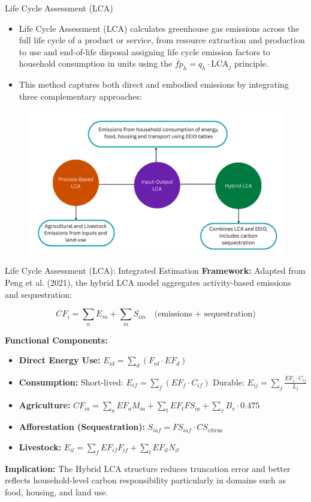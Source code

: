 \documentclass{beamer}
\begin{document}
\begin{frame}{Life Cycle Assessment (LCA)}
\footnotesize
\vspace{-2.5em}
\begin{itemize}
\item Life Cycle Assessment (LCA) calculates greenhouse gas emissions across the full life cycle of a product or service, from resource extraction and production to use and end-of-life disposal assigning life cycle emission factors to household consumption in units using the \textbf{$fp_h = q_h \cdot \text{LCA}_j$} principle. 
\item This method captures both direct and embodied emissions by integrating three complementary approaches:
\end{itemize}
\vspace{-0.5em}
\begin{figure}
\centering
\includegraphics[width=0.7\linewidth]{LCA Visual.png}
\end{figure}
\end{frame}

\begin{frame}{Life Cycle Assessment (LCA): Integrated Estimation}
\footnotesize
\vspace{-2.5em}
\textbf{Framework:}  
Adapted from Peng et al. (2021), the hybrid LCA model aggregates activity-based emissions and sequestration:

\[
CF_i = \sum_n E_{in} + \sum_m S_{im}
\quad \text{(emissions + sequestration)}
\]

\vspace{0.3em}
\textbf{Functional Components:}
\begin{itemize}
  \item \textbf{Direct Energy Use:} $E_{id} = \sum_d (F_{id} \cdot EF_d)$
  \item \textbf{Consumption:} Short-lived: $E_{if} = \sum_f (EF_f \cdot C_{if})$  
        Durable: $E_{ij} = \sum_j \frac{EF_j \cdot C_{ij}}{L_j}$
  \item \textbf{Agriculture:} $CF_{ia} = \sum_a EF_a M_{ia} + \sum_t EF_t FS_{ia} + \sum_v B_v \cdot 0.475$
  \item \textbf{Afforestation (Sequestration):} $S_{iaf} = FS_{iaf} \cdot CS_{\text{citrus}}$
  \item \textbf{Livestock:} $E_{il} = \sum_f EF_{if} F_{if} + \sum_l EF_{il} N_{il}$
\end{itemize}

\vspace{0.3em}
\textbf{Implication:}  
The Hybrid LCA structure reduces truncation error and better reflects household-level carbon responsibility particularly in domains such as food, housing, and land use.
\end{frame}
\end{document}
